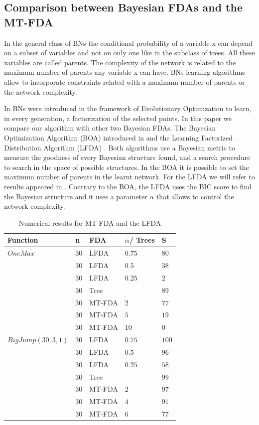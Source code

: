 \documentclass[10pt,thmsa]{article}
\begin{document}
\subsection{Comparison between Bayesian FDAs and the MT-FDA}

In the general class of BNs the conditional probability of a variable x can
depend on a subset of variables and not on only one like in the subclass of
trees. All these variables are called parents. The complexity of the network
is related to the maximum number of parents any variable x can have. BNs
learning algorithms allow to incorporate constraints related with a maximum
number of parents or the network complexity.

In \citep{Etxeberria_and_Larranhaga:1999} BNs were introduced in the
framework of Evolutionary Optimization to learn, in every generation, a
factorization of the selected points. In this paper we compare our algorithm
with other two Bayesian FDAs. The Bayesian Optimization Algorithm (BOA)
introduced in \citep{Pelikan_et_al:1999} and the Learning Factorized
Distribution Algorithm (LFDA) \citep{Muhlenbein_and_Mahnig:1999}. Both
algorithms use a Bayesian metric to measure the goodness of every Bayesian
structure found, and a search procedure to search in the space of possible
structures. In the BOA it is possible to set the maximum number of parents
in the learnt network. For the LFDA we will refer to results appeared in %
\citep{Muehlenbein_et_Mahnig:1999a}. Contrary to the BOA, the LFDA uses the
BIC score to find the Bayesian structure and it uses a parameter $\alpha $
that allows to control the network complexity.

\begin{table}[tbph]
\begin{center}
\begin{tabular}{|l|l|l|l|l|}
\hline
Function & n & FDA & $\alpha $/ Trees & S \\ \hline
$OneMax$ & $30$ & LFDA & $0.75$ & $80$ \\ \hline
& $30$ & LFDA & $0.5$ & $38$ \\ \hline
& $30$ & LFDA & $0.25$ & $2$ \\ \hline
& $30$ & Tree &  & $89$ \\ \hline
& $30$ & MT-FDA & $2$ & $77$ \\ \hline
& $30$ & MT-FDA & $5$ & $19$ \\ \hline
& $30$ & MT-FDA & $10$ & $0$ \\ \hline
$BigJump(30,3,1)$ & $30$ & LFDA & $0.75$ & $100$ \\ \hline
& $30$ & LFDA & $0.5$ & $96$ \\ \hline
& $30$ & LFDA & $0.25$ & $58$ \\ \hline
& $30$ & Tree &  & $99$ \\ \hline
& $30$ & MT-FDA & $2$ & $97$ \\ \hline
& $30$ & MT-FDA & $4$ & $91$ \\ \hline
& $30$ & MT-FDA & $6$ & $77$ \\ \hline
\end{tabular}
\end{center}
\caption{Numerical results for MT-FDA and the LFDA}
\end{table}
\end{document}
